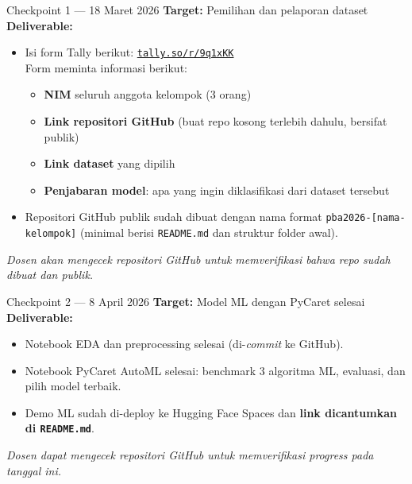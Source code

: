 \documentclass[11pt,a4paper]{article}
\begin{document}
\begin{checkpointbox}[colframe=itera]{Checkpoint 1 --- 18 Maret 2026}
\textbf{Target:} Pemilihan dan pelaporan dataset\\[4pt]
\textbf{Deliverable:}
\begin{itemize}[noitemsep]
  \item Isi form Tally berikut: \href{https://tally.so/r/9q1xKK}{\texttt{tally.so/r/9q1xKK}}\\
  Form meminta informasi berikut:
  \begin{itemize}[noitemsep]
    \item \textbf{NIM} seluruh anggota kelompok (3 orang)
    \item \textbf{Link repositori GitHub} (buat repo kosong terlebih dahulu, bersifat publik)
    \item \textbf{Link dataset} yang dipilih
    \item \textbf{Penjabaran model}: apa yang ingin diklasifikasi dari dataset tersebut
  \end{itemize}
  \item Repositori GitHub publik sudah dibuat dengan nama format \texttt{pba2026-[nama-kelompok]} (minimal berisi \texttt{README.md} dan struktur folder awal).
\end{itemize}
\textit{\small Dosen akan mengecek repositori GitHub untuk memverifikasi bahwa repo sudah dibuat dan publik.}
\end{checkpointbox}

\vspace{0.5em}

\begin{checkpointbox}[colframe=itera!70!green]{Checkpoint 2 --- 8 April 2026}
\textbf{Target:} Model ML dengan PyCaret selesai\\[4pt]
\textbf{Deliverable:}
\begin{itemize}[noitemsep]
  \item Notebook EDA dan preprocessing selesai (di-\textit{commit} ke GitHub).
  \item Notebook PyCaret AutoML selesai: benchmark 3 algoritma ML, evaluasi, dan pilih model terbaik.
  \item Demo ML sudah di-deploy ke Hugging Face Spaces dan \textbf{link dicantumkan di \texttt{README.md}}.
\end{itemize}
\textit{\small Dosen dapat mengecek repositori GitHub untuk memverifikasi progress pada tanggal ini.}
\end{checkpointbox}
\end{document}
